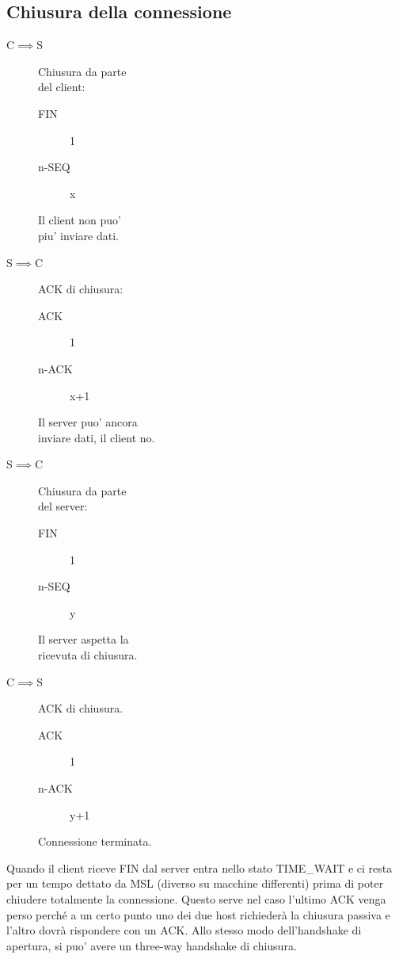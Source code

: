 \subsection{Chiusura della connessione}
\setlength{\columnseprule}{0.4pt}
\setlength{\columnsep}{5em}
\begin{multicols}{2}
    \begin{description}
        \item[C$\implies$S] Chiusura da parte\\del client:
        \begin{description}
            \item[FIN] 1
            \item[n-SEQ] x  
        \end{description} 
        Il client non puo'\\piu' inviare dati.
        \item[S$\implies$C] ACK di chiusura:
        \begin{description}
            \item[ACK] 1
            \item[n-ACK] x+1  
        \end{description}  
        Il server puo' ancora\\inviare dati, il client no.
        \item[S$\implies$C] Chiusura da parte\\del server:
        \begin{description}
            \item[FIN] 1
            \item[n-SEQ] y  
        \end{description} 
        Il server aspetta la\\ricevuta di chiusura.
        \item[C$\implies$S] ACK di chiusura.
        \begin{description}
            \item[ACK] 1
            \item[n-ACK] y+1  
        \end{description} 
        Connessione terminata.
    \end{description}
\end{multicols}
\setlength{\columnseprule}{0pt}
\setlength{\columnsep}{1em}
Quando il client riceve FIN dal server entra nello stato {\color{blue} TIME\_WAIT} e ci resta per un tempo dettato da MSL (diverso su macchine differenti) prima di poter chiudere totalmente la connessione. Questo serve nel caso l'ultimo ACK venga perso perché a un certo punto uno dei due host richiederà la chiusura passiva e l'altro dovrà rispondere con un ACK.
Allo stesso modo dell'handshake di apertura, si puo' avere un three-way handshake di chiusura.
